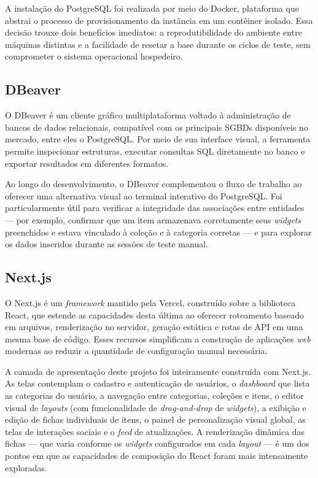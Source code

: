 A instalação do PostgreSQL foi realizada por meio do Docker, plataforma que abstrai o processo de provisionamento da instância em um contêiner isolado. Essa decisão trouxe dois benefícios imediatos: a reprodutibilidade do ambiente entre máquinas distintas e a facilidade de resetar a base durante os ciclos de teste, sem comprometer o sistema operacional hospedeiro.

\subsection{DBeaver}

O DBeaver é um cliente gráfico multiplataforma voltado à administração de bancos de dados relacionais, compatível com os principais SGBDs disponíveis no mercado, entre eles o PostgreSQL. Por meio de sua interface visual, a ferramenta permite inspecionar estruturas, executar consultas SQL diretamente no banco e exportar resultados em diferentes formatos.

Ao longo do desenvolvimento, o DBeaver complementou o fluxo de trabalho ao oferecer uma alternativa visual ao terminal interativo do PostgreSQL. Foi particularmente útil para verificar a integridade das associações entre entidades --- por exemplo, confirmar que um item armazenava corretamente seus \textit{widgets} preenchidos e estava vinculado à coleção e à categoria corretas --- e para explorar os dados inseridos durante as sessões de teste manual.

\subsection{Next.js}

O Next.js é um \textit{framework} mantido pela Vercel, construído sobre a biblioteca React, que estende as capacidades desta última ao oferecer roteamento baseado em arquivos, renderização no servidor, geração estática e rotas de API em uma mesma base de código. Esses recursos simplificam a construção de aplicações \textit{web} modernas ao reduzir a quantidade de configuração manual necessária.

A camada de apresentação deste projeto foi inteiramente construída com Next.js. As telas contemplam o cadastro e autenticação de usuários, o \textit{dashboard} que lista as categorias do usuário, a navegação entre categorias, coleções e itens, o editor visual de \textit{layouts} (com funcionalidade de \textit{drag-and-drop} de \textit{widgets}), a exibição e edição de fichas individuais de itens, o painel de personalização visual global, as telas de interações sociais e o \textit{feed} de atualizações. A renderização dinâmica das fichas --- que varia conforme os \textit{widgets} configurados em cada \textit{layout} --- é um dos pontos em que as capacidades de composição do React foram mais intensamente exploradas.

